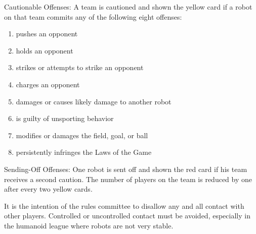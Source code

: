 \documentclass[12pt]{hurocup}
\begin{document}
\begin{lawlist}[US]
\item Cautionable Offenses: A team is cautioned and shown the yellow
  card if a robot on that team commits any of the following eight
  offenses:
  \begin{enumerate}
    \item pushes an opponent
    \item holds an opponent
    \item strikes or attempts to strike an opponent
    \item charges an opponent
    \item damages or causes likely damage to another robot
    \item is guilty of unsporting behavior
    \item modifies or damages the field, goal, or ball
    \item persistently infringes the Laws of the Game
  \end{enumerate}
\item Sending-Off Offenses: One robot is sent off and shown the red
  card if his team receives a second caution. The number of players on
  the team is reduced by one after every two yellow cards.
\end{lawlist}

\begin{decisions}
\item It is the intention of the rules committee to disallow any
  and all contact with other players. Controlled or uncontrolled
  contact must be avoided, especially in the humanoid league where
  robots are not very stable.
\end{decisions}

\label{law:penalty-kick}
\end{document}
